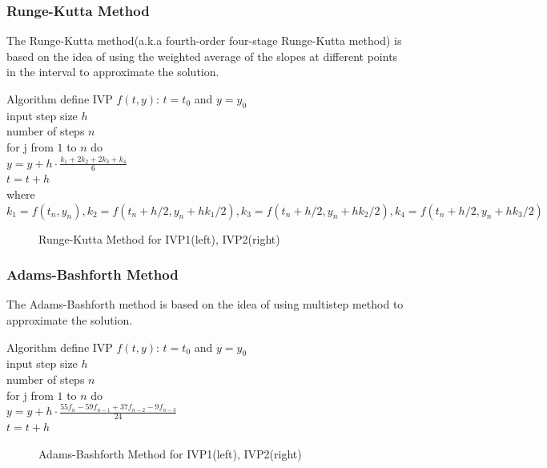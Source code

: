 \documentclass[UTF8]{beamer}
\begin{document}
\begin{frame}[allowframebreaks]
	\frametitle{Runge-Kutta Method}
The Runge-Kutta method(a.k.a fourth-order four-stage Runge-Kutta method) is based on the idea of using the weighted average of the slopes at different points in the interval to approximate the solution.
\begin{block}{Algorithm}
define IVP $f(t,y)$: $t = t_0$ and $y = y_0$ \\
input step size $h$ \\number of steps $n$ \\
for j from $1$ to $n$ do\\
$y = y + h \cdot \frac{k_1+2k_2+2k_3+k_4}{6}$\\ $
t=t+h$\\
where $k_1=f(t_n,y_n), k_2=f(t_n+h/2,y_n+hk_1/2), k_3=f(t_n+h/2,y_n+hk_2/2), k_4=f(t_n+h/2,y_n+hk_3/2)$
\end{block}
	\begin{figure}
		\centering
		\scalebox{0.45}{}
		\caption{Runge-Kutta Method for IVP1(left), IVP2(right)}
	\end{figure}
\end{frame}

\begin{frame}[allowframebreaks]
	\frametitle{Adams-Bashforth Method}
The Adams-Bashforth method is based on the idea of using multistep method to approximate the solution.
	\begin{block}{Algorithm}
		define IVP $f(t,y)$: $t = t_0$ and $y = y_0$ \\
		input step size $h$ \\number of steps $n$ \\
		for j from $1$ to $n$ do\\
		$y = y + h \cdot \frac{55f_n-59f_{n-1}+37f_{n-2}-9f_{n-3}}{24}$\\ $
		t=t+h$
		\end{block}
	\begin{figure}
		\centering
		\scalebox{0.45}{}
		\caption{Adams-Bashforth Method for IVP1(left), IVP2(right)}
	\end{figure}
\end{frame}
\end{document}
